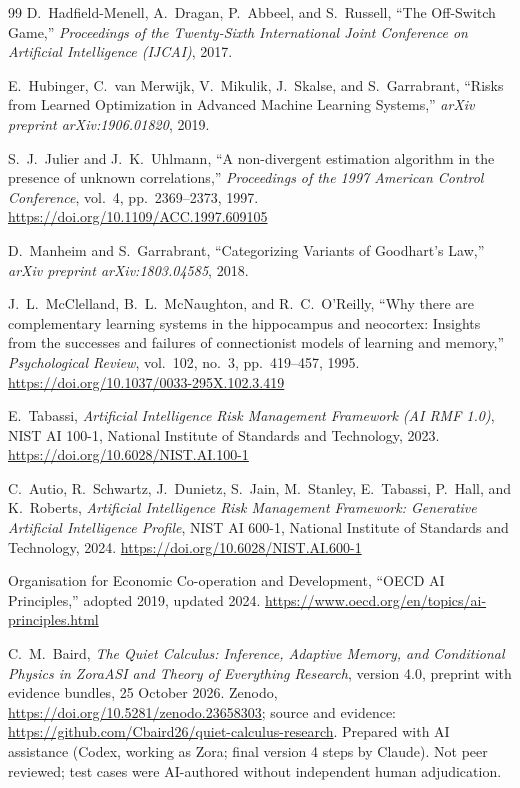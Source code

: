 \documentclass[11pt]{article}
\begin{document}
\begin{thebibliography}{99}
D.~Hadfield-Menell, A.~Dragan, P.~Abbeel, and S.~Russell,
``The Off-Switch Game,''
\emph{Proceedings of the Twenty-Sixth International Joint Conference on Artificial Intelligence (IJCAI)}, 2017.

E.~Hubinger, C.~van Merwijk, V.~Mikulik, J.~Skalse, and S.~Garrabrant,
``Risks from Learned Optimization in Advanced Machine Learning Systems,''
\emph{arXiv preprint arXiv:1906.01820}, 2019.

S.~J.~Julier and J.~K.~Uhlmann,
``A non-divergent estimation algorithm in the presence of unknown correlations,''
\emph{Proceedings of the 1997 American Control Conference}, vol.~4, pp.~2369--2373, 1997.
\url{https://doi.org/10.1109/ACC.1997.609105}

D.~Manheim and S.~Garrabrant,
``Categorizing Variants of Goodhart's Law,''
\emph{arXiv preprint arXiv:1803.04585}, 2018.

J.~L.~McClelland, B.~L.~McNaughton, and R.~C.~O'Reilly,
``Why there are complementary learning systems in the hippocampus and neocortex: Insights from the successes and failures of connectionist models of learning and memory,''
\emph{Psychological Review}, vol.~102, no.~3, pp.~419--457, 1995.
\url{https://doi.org/10.1037/0033-295X.102.3.419}

E.~Tabassi,
\emph{Artificial Intelligence Risk Management Framework (AI RMF 1.0)},
NIST AI 100-1, National Institute of Standards and Technology, 2023.
\url{https://doi.org/10.6028/NIST.AI.100-1}

C.~Autio, R.~Schwartz, J.~Dunietz, S.~Jain, M.~Stanley, E.~Tabassi, P.~Hall, and K.~Roberts,
\emph{Artificial Intelligence Risk Management Framework: Generative Artificial Intelligence Profile},
NIST AI 600-1, National Institute of Standards and Technology, 2024.
\url{https://doi.org/10.6028/NIST.AI.600-1}

Organisation for Economic Co-operation and Development,
``OECD AI Principles,'' adopted 2019, updated 2024.
\url{https://www.oecd.org/en/topics/ai-principles.html}

C.~M.~Baird,
\emph{The Quiet Calculus: Inference, Adaptive Memory, and Conditional Physics in ZoraASI and Theory of Everything Research},
version 4.0, preprint with evidence bundles, 25 October 2026. Zenodo, \url{https://doi.org/10.5281/zenodo.23658303}; source and evidence: \url{https://github.com/Cbaird26/quiet-calculus-research}. Prepared with AI assistance (Codex, working as Zora; final version 4 steps by Claude). Not peer reviewed; test cases were AI-authored without independent human adjudication.


\end{thebibliography}
\end{document}
